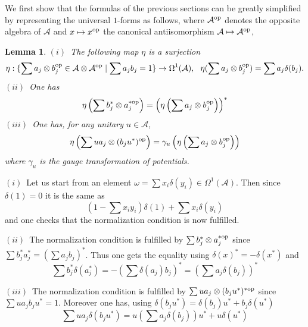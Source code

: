 \documentclass[preprint]{revtex4}
\newtheorem{lma}[thm]{Lemma}
\begin{document}
We  first show that the formulas of the previous sections can be greatly simplified by representing the universal $1$-forms as follows, where ${\mathcal{A}}^{\rm op}$ denotes the opposite algebra of  ${\mathcal{A}}$ and $x\mapsto x^{\rm op}$ the canonical antiisomorphism 
${\mathcal{A}}\mapsto {\mathcal{A}}^{\rm op}$,
\begin{lma}
$(i)$~The following map $\eta$ is a surjection
\begin{equation*}
 \eta: \{\sum a_j\otimes b_j^{\rm op}\in  {\mathcal{A}}\otimes {\mathcal{A}}^{\rm op}\mid \sum a_jb_j=1\}
 \to \Omega^1({\mathcal{A}}),\ \ \eta(\sum a_j\otimes b_j^{\rm op})=\sum a_j\delta( b_j).
\end{equation*}
$(ii)$~One has
\begin{equation*}
    \eta\left(\sum b_j^*\otimes a_j^{*\rm op}\right)=\left(\eta\left(\sum a_j\otimes b_j^{\rm op}\right)\right)^*
\end{equation*}
$(iii)$~One has, for any unitary $u\in {\mathcal{A}}$,
\begin{equation*}
    \eta\left(\sum u a_j\otimes (b_ju^*)^{\rm op}\right)=\gamma_u\left(\eta\left(\sum a_j\otimes b_j^{\rm op}\right)\right)
\end{equation*}
where $\gamma_u$ is the gauge transformation of potentials.
\end{lma}
\proof $(i)$~Let us start from an element $\omega=\sum x_i\delta(y_i)\in \Omega^1({\mathcal{A}})$. Then since $\delta(1)=0$ it is the same as
\begin{equation*}
   (1-\sum x_i y_i)\delta(1)+ \sum x_i\delta(y_i)
\end{equation*}
and one checks that the normalization condition is now fulfilled.

$(ii)$~The normalization condition is fulfilled by $\sum b_j^*\otimes a_j^{*\rm op}$ since $\sum b_j^*a_j^*=(\sum a_jb_j)^*$. Thus one gets the equality  using $\delta(x)^*=-\delta(x^*)$ and
\begin{equation*}
    \sum b_j^*\delta( a_j^*)=-\left(\sum \delta(a_j)b_j\right)^*=
    \left(\sum a_j\delta(b_j)\right)^*
\end{equation*}

$(iii)$~The normalization condition is fulfilled by $\sum ua_j\otimes (b_ju^*)^{*\rm op}$ since
$\sum ua_j b_ju^*=1$. Moreover one has, using $\delta (b_ju^*)=\delta(b_j)u^*+b_j\delta(u^*)$
\begin{equation*}
   \sum ua_j\delta (b_ju^*)=u\left(\sum a_j\delta(b_j)\right) u^*+u\delta(u^*)
\end{equation*}
\endproof
\end{document}
